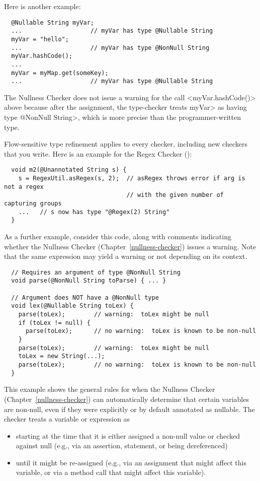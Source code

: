 Here is another example:

\begin{Verbatim}
  @Nullable String myVar;
  ...                   // myVar has type @Nullable String
  myVar = "hello";
  ...                   // myVar has type @NonNull String
  myVar.hashCode();
  ...
  myVar = myMap.get(someKey);
  ...                   // myVar has type @Nullable String
\end{Verbatim}

\noindent
The Nullness Checker does not issue a warning for
the call <myVar.hashCode()> above because after the assignment,
the type-checker
treats \<myVar> as having type \<@NonNull String>, which is more precise
than the programmer-written type.


Flow-sensitive type refinement applies to every checker, including new
checkers that you write.  Here is an example for the Regex Checker
():

\begin{Verbatim}
  void m2(@Unannotated String s) {
    s = RegexUtil.asRegex(s, 2);  // asRegex throws error if arg is not a regex
                                  // with the given number of capturing groups
    ...   // s now has type "@Regex(2) String"
  }
\end{Verbatim}


As a further example, 
consider this code, along with comments indicating whether the
Nullness Checker (Chapter~\ref{nullness-checker}) issues a warning.  Note that the same expression may yield a
warning or not depending on its context.

\begin{Verbatim}
  // Requires an argument of type @NonNull String
  void parse(@NonNull String toParse) { ... }

  // Argument does NOT have a @NonNull type
  void lex(@Nullable String toLex) {
    parse(toLex);        // warning:  toLex might be null
    if (toLex != null) {
      parse(toLex);      // no warning:  toLex is known to be non-null
    }
    parse(toLex);        // warning:  toLex might be null
    toLex = new String(...);
    parse(toLex);        // no warning:  toLex is known to be non-null
  }
\end{Verbatim}

This example shows the general rules for when
the Nullness Checker (Chapter~\ref{nullness-checker}) can automatically
determine that certain variables are non-null, even if they were explicitly
or by default annotated as nullable.
The checker treats a variable or expression as 
\begin{itemize}
\item
starting at the time that it is either
assigned a non-null value or checked against null (e.g., via an assertion,
 statement, or being dereferenced)
\item
until it might be re-assigned (e.g.,
via an assignment that might affect this variable, or via a method call
that might affect this variable).
\end{itemize}


